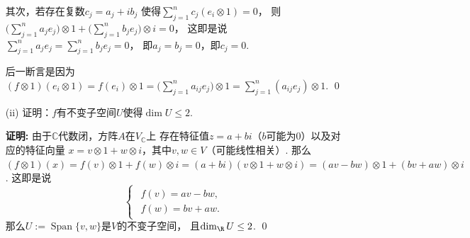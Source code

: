 \begin{enumerate}
        其次，若存在复数$c_{j} = a_{j}+ib_{j}$
        使得$\sum_{j=1}^{n}c_{j}(e_{i} \otimes 1) = 0$，
        则$\big(\sum_{j=1}^{n}a_{j}e_{j}\big) \otimes 1 
        + \big(\sum_{j=1}^{n}b_{j}e_{j}\big) \otimes i=0$，
        这即是说$\sum_{j=1}^{n}a_{j}e_{j} = \sum_{j=1}^{n}b_{j}e_{j} = 0$，
        即$a_{j}=b_{j}=0$，即$c_{j}=0$. \par
        后一断言是因为$(f \otimes 1)(e_{i} \otimes 1) = f(e_{i}) \otimes 1 
        = \big(\sum_{j=1}^{n}a_{ij}e_{j}\big) \otimes 1 
        = \sum_{j=1}^{n}(a_{ij}e_{j}) \otimes 1$. \qed
    \item[(ii)] 证明：$f$有不变子空间$U$使得$\dim U \leq 2$.
    \item[\textbf{证明:}]
        由于$\mathbb{C}$代数闭，方阵$A$在$V_{\mathbb{C}}$上
        存在特征值$z=a+bi$（$b$可能为$0$）以及对应的特征向量
        $x=v \otimes 1 + w \otimes i$，其中$v,w \in V$（可能线性相关）. 
        那么$(f \otimes 1)(x) = f(v) \otimes 1 + f(w) \otimes i 
        = (a+bi)(v \otimes 1 + w \otimes i) 
        = (av-bw) \otimes 1 + (bv + aw) \otimes i$.
        这即是说
        \[\begin{cases}\begin{aligned}
            f(v) = av - bw, \\
            f(w) = bv + aw.
        \end{aligned}\end{cases}\]
        那么$U := \operatorname{Span}\{v,w\}$是$V$的不变子空间，
        且$\dim_{\R} U \leq 2$. \qed


\end{enumerate}
